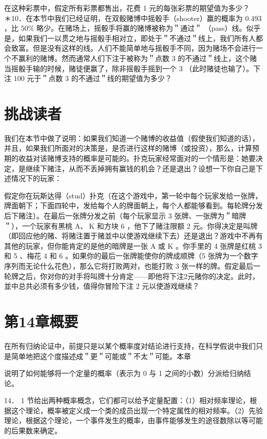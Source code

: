 在这种彩票中，假定所有彩票都售出，花费 1 元的每张彩票的期望值为多少？\\
＊10．在本节中我们已经证明，在双骰赌博中摇骰手（shooter）赢的概率为 0.493 ，比 $50 \%$ 略少。在赌场上，摇骰手将赢的赌博被称为＂通过＂ （pass）线。似乎是，如果我们一以贯之地与摇骰手相对立，即处于＂不通过＂线上，我们所有人都会致富。但是没有这样的线。人们不能简单地与摇骰手不同，因为赌场不会进行一个不赢利的赌博。然而通常人们下注于被称为＂点数 3 的不通过＂线上，这个赌当摇骰手输的时候，赌徒便赢了，除非摇骰手摇到一个 3 （此时赌徒也输了）。下注 100 元于＂点数 3 的不通过＂线的期望值为多少？

\section*{挑战读者}
我们在本节中做了说明：如果我们知道一个赌博的收益值（假使我们知道的话），并且，如果我们所面对的决策是，是否进行这样的赌博（或投资），那么，计算预期的收益对该赌博支持的概率是可能的。扑克玩家经常面对的一个情形是：她要决定，是继续下赌注，从而不丢掉拥有赢钱的机会？还是退出？设想一下你自己是下述情况下的玩家：

假定你在玩斯达得（stud）扑克（在这个游戏中，第一轮中每个玩家发给一张牌，牌面朝下；下面四轮中，发给每个人的牌面朝上，每个人都能够看到。每轮牌分发后下赌注）。在最后一张牌分发之前（每个玩家显示 3 张牌、一张牌为＂暗牌＂），一个玩家有黑桃 $\mathrm{A} 、 \mathrm{~K}$ 和方块 6 ，他下了赌注限额 2 元。你得决定是叫牌（即回应他的赌、将赌注置于赌並中以使游戏继续下去）还是退出？游戏中不再有其他的玩家，但你能肯定的是他的暗牌是一张 A 或 K 。你手里的 4 张牌是红桃 3 和 5 、梅花 4 和 6 。如果你的最后一张牌能使你的牌成顺牌（5 张牌为一个数字序列而无论什么花色），那么它将打败两对，也能打败 3 张一样的牌。假定最后一轮牌之后，你对你的对手将叫牌十分肯定——即他将下注2元赌你的决定。此时，並中总共必须有多少钱，值得你冒险下注 2 元以使游戏继续？

\section*{第14章概要}
在所有归纳论证中，前提只是以某个概率度对结论进行支持，在科学假说中我们只是简单地把这个度描述成＂更＂可能或＂不太＂可能。本章

说明了如何能够将一个定量的概率（表示为 0 与 1 之间的小数）分派给归纳结论。

14． 1 节给出两种概率概念，它们都可以给予定量配置：（1）相对频率理论，根据这个理论，概率被定义成一个类的成员出现一个特定属性的相对频率。（2）先验理论，根据这个理论，一个事件发生的概率，由事件能够发生的途径数除以等可能的后果数来确定。

